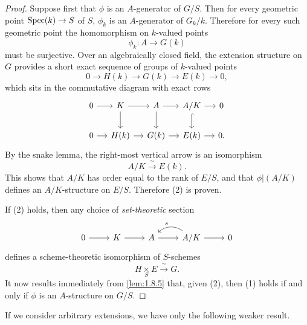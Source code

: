 \begin{proof}
Suppose first that $\phi$ is an $A$-generator of $G/S$. Then for every geometric point $\operatorname{Spec}(k) \to S$ of $S$, $\phi_k$ is an $A$-generator of $G_k/k$. Therefore for every such geometric point the homomorphism on $k$-valued points
\[
\phi_k \colon A \longrightarrow G(k)
\]
must be surjective. Over an algebraically closed field, the extension structure on $G$ provides a short exact sequence of groups of $k$-valued points
\[
0 \longrightarrow H(k) \longrightarrow G(k) \longrightarrow E(k) \longrightarrow 0,
\]
which sits in the commutative diagram with exact rows
\[
\begin{tikzcd}[column sep=small]
0 \arrow[r] & K \arrow[r] \arrow[d] & A \arrow[r] \arrow[d] & A/K \arrow[r] \arrow[d, hook] & 0 \\
0 \arrow[r] & H(k) \arrow[r] & G(k) \arrow[r] & E(k) \arrow[r] & 0.
\end{tikzcd}
\]
By the snake lemma, the right-most vertical arrow is an isomorphism
\[
A/K \xrightarrow{\ \sim\ } E(k).
\]
This shows that $A/K$ has order equal to the rank of $E/S$, and that $\phi|(A/K)$ defines an $A/K$-structure on $E/S$. Therefore (2) is proven.

If (2) holds, then any choice of \emph{set-theoretic} section
\[
\begin{tikzcd}
0 \arrow[r] & K \arrow[r] & A \arrow[r] & A/K \arrow[r] \arrow[l, bend right=40, "s"'] & 0
\end{tikzcd}
\]
defines a scheme-theoretic isomorphism of $S$-schemes
\[
H \underset{S}{\times} E \xrightarrow{\ \sim\ } G.
\]
It now results immediately from \ref{lem:1.8.5} that, given (2), then (1) holds if and only if $\phi$ is an $A$-structure on $G/S$.
\end{proof}

If we consider arbitrary extensions, we have only the following weaker result.

